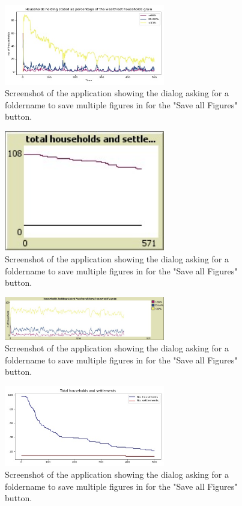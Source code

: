 \documentclass[12pt]{article}
\begin{document}
	\begin{figure}[!htb]
		\includegraphics[width=7cm]{Default_values_run1_B}
		\caption{Screenshot of the application showing the dialog asking for a foldername to save multiple figures in for the "Save all Figures" button.}
		\label{fig:Default_values_run_1_B}
	\end{figure}

	\begin{figure}[!htb]
		\includegraphics[width=7cm]{Default_values_run1_C}
		\caption{Screenshot of the application showing the dialog asking for a foldername to save multiple figures in for the "Save all Figures" button.}
		\label{fig:Default_values_run_1_C}
	\end{figure}

	\begin{figure}[!htb]
		\includegraphics[width=7cm]{Default_values_run1_D}
		\caption{Screenshot of the application showing the dialog asking for a foldername to save multiple figures in for the "Save all Figures" button.}
		\label{fig:Default_values_run_1_D}
	\end{figure}

	\begin{figure}[!htb]
		\includegraphics[width=7cm]{Land_rental_enabled_run1_A}
		\caption{Screenshot of the application showing the dialog asking for a foldername to save multiple figures in for the "Save all Figures" button.}
		\label{fig:Land_rental_enabled_run1_A}
	\end{figure}
\end{document}
